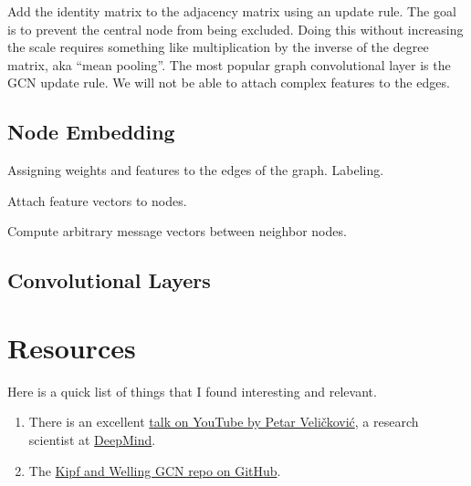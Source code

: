 Add the identity matrix to the adjacency matrix using an update rule. 
The goal is to prevent the central node from being excluded. Doing this without increasing the scale requires something like multiplication by the inverse of the degree matrix, aka ``mean pooling''. The
most popular graph convolutional layer is the GCN update rule. We will not be able to attach complex features to the edges.

\subsection{\label{sec:embedding}Node Embedding}

\justifying
Assigning weights and features to the edges of the graph. Labeling.

Attach feature vectors to nodes.

Compute arbitrary message vectors between neighbor nodes.

\subsection{\label{sec:conv}Convolutional Layers}

\section{\label{sec:reading}Resources}

\justifying
Here is a quick list of things that I found interesting and relevant.

\begin{raggedright}
	\begin{enumerate}
		\item There is an excellent \href{https://www.youtube.com/watch?v=8owQBFAHw7E}{talk on YouTube by Petar Veličković}, a research scientist at \href{https://deepmind.com/about}{DeepMind}.
		\item The \href{https://github.com/tkipf/gcn}{Kipf and Welling GCN repo on GitHub}.
    \end{enumerate}
\end{raggedright}
\vspace{2mm}

\clearpage
\begin{versionhistory}
\end{versionhistory}
\nocite{*}




